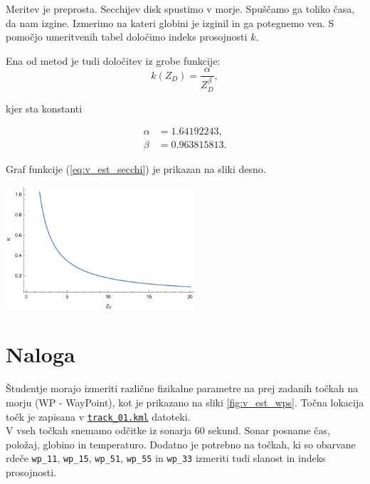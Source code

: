 \documentclass[11pt]{article}
\begin{document}
\noindent
Meritev je preprosta. Secchijev disk spustimo v morje. Spuščamo ga toliko časa, da nam izgine. Izmerimo na kateri globini je izginil in ga potegnemo ven. S pomočjo umeritvenih tabel določimo indeks prosojnosti $k$.

\noindent
Ena od metod je tudi določitev iz grobe funkcije:
\begin{equation}
\label{eq:v_est_secchi}
k(Z_D) = \frac{\alpha}{Z_D^{\beta}},
\end{equation}

\begin{minipage}{4cm}
	\noindent
	kjer sta konstanti
	
	\begin{align*}
	\alpha & = 1.64192243,\\
	\beta  & = 0.963815813.
	\end{align*}
	
	\noindent
	Graf funkcije (\ref{eq:v_est_secchi}) je prikazan na sliki desno.
\end{minipage}
\begin{minipage}{7.5cm}
	\centering \includegraphics[width=7cm]{figs/secchi_func.pdf}
\end{minipage}

\newpage
\section{Naloga}
Študentje morajo izmeriti različne fizikalne parametre na prej zadanih točkah na morju (WP - WayPoint), kot je prikazano na sliki \ref{fig:v_est_wps}. Točna lokacija točk je zapisana v \href{https://drive.google.com/open?id=0B1dT-CBA07ANWDI0dDdkc1p1TkU}{\texttt{track\_01.kml}} datoteki.\\[5mm]

\noindent
V vseh točkah snemamo odčitke iz sonarja 60 sekund. Sonar posname čas, položaj, globino in temperaturo. Dodatno je potrebno na točkah, ki so obarvane rdeče \texttt{wp\_11}, \texttt{wp\_15}, \texttt{wp\_51}, \texttt{wp\_55} in \texttt{wp\_33} izmeriti tudi slanost in indeks prosojnosti.\\[5mm]
\end{document}
